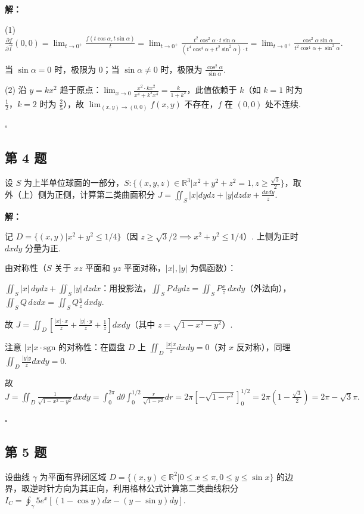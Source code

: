 \documentclass[12pt,a4paper]{article}
\newenvironment{sol}[1][解]{%
  \par\medskip\noindent\textbf{#1：}\itshape\par\noindent\ignorespaces
}{%
  \par\hfill$\square$\par\medskip
}
\begin{document}
\begin{sol}(1) $\frac{\partial f}{\partial\vec{l}}(0,0)=\lim_{t\to
  0^+}\frac{f(t\cos\alpha,t\sin\alpha)}{t}=\lim_{t\to
  0^+}\frac{t^2\cos^2\alpha\cdot
  t\sin\alpha}{(t^4\cos^4\alpha+t^2\sin^2\alpha)\cdot t}=\lim_{t\to
  0^+}\frac{\cos^2\alpha\sin\alpha}{t^2\cos^4\alpha+\sin^2\alpha}.$

  当 $\sin\alpha=0$ 时，极限为 $0$；当 $\sin\alpha\ne 0$ 时，极限为
  $\frac{\cos^2\alpha}{\sin\alpha}$.

  (2) 沿 $y=kx^2$ 趋于原点：$\lim_{x\to 0}\frac{x^2\cdot
  kx^2}{x^4+k^2x^4}=\frac{k}{1+k^2}$，此值依赖于 $k$（如 $k=1$ 时为
  $\frac{1}{2}$，$k=2$ 时为 $\frac{2}{5}$），故 $\lim_{(x,y)\to(0,0)}f(x,y)$
  不存在，$f$ 在 $(0,0)$ 处不连续.

\end{sol}
\subsection*{第 4 题}
设 $S$ 为上半单位球面的一部分，$S: \{(x,y,z)\in\mathbb{R}^3|x^2+y^2+z^2=1,
z\ge\frac{\sqrt{3}}{2}\}$，取外（上）侧为正侧，计算第二类曲面积分
$J=\iint_{S}|x|dydz+|y|dzdx+\frac{dxdy}{z}$.

\begin{sol}记 $D=\{(x,y)|x^2+y^2\le 1/4\}$（因 $z\ge\sqrt{3}/2\implies
  x^2+y^2\le 1/4$）. 上侧为正时 $dxdy$ 分量为正.

  由对称性（$S$ 关于 $xz$ 平面和 $yz$ 平面对称，$|x|,|y|$ 为偶函数）：

  $\iint_S|x|\,dydz+\iint_S|y|\,dzdx$：用投影法，$\iint_S P\,dydz=\iint_S
  P\frac{x}{z}\,dxdy$（外法向），$\iint_S Q\,dzdx=\iint_S Q\frac{y}{z}\,dxdy$.

  故 $J=\iint_D\left[\frac{|x|\cdot x}{z}+\frac{|y|\cdot
  y}{z}+\frac{1}{z}\right]dxdy$（其中 $z=\sqrt{1-x^2-y^2}$）.

  注意 $|x|x\cdot\text{sgn}$ 的对称性：在圆盘 $D$ 上
  $\iint_D\frac{|x|x}{z}dxdy=0$（对 $x$ 反对称），同理 $\iint_D\frac{|y|y}{z}dxdy=0$.

  故
  $J=\iint_D\frac{1}{\sqrt{1-x^2-y^2}}dxdy=\int_0^{2\pi}d\theta\int_0^{1/2}\frac{r}{\sqrt{1-r^2}}dr=2\pi[-\sqrt{1-r^2}]_0^{1/2}=2\pi(1-\frac{\sqrt{3}}{2})=2\pi-\sqrt{3}\pi.$

\end{sol}
\subsection*{第 5 题}
设曲线 $\gamma$ 为平面有界闭区域 $D=\{(x,y)\in\mathbb{R}^2|0\le x\le\pi, 0\le
y\le\sin x\}$ 的边界，取逆时针方向为其正向，利用格林公式计算第二类曲线积分
$I_C=\oint_{\gamma}5e^x[(1-\cos y)dx-(y-\sin y)dy]$.
\end{document}
